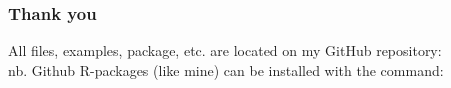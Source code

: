 \documentclass{beamer}
\begin{document}
\begin{frame}
\frametitle{Thank you}
All files, examples, package, etc. are located on my GitHub repository:
\vspace{.1in}
 \\

\vspace{.1in}
nb. Github R-packages (like mine) can be installed with the command:
\vspace{.1in}

\end{frame}
\end{document}
